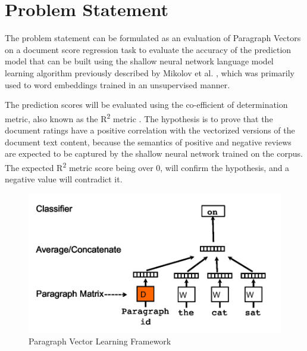 \documentclass[conference]{IEEEtran}
\begin{document}
\vspace{5mm}

\section{Problem Statement} \label{problem_statment}
    The problem statement can be formulated as an evaluation of Paragraph Vectors\cite{le2014distributed} on a document score regression task to evaluate the accuracy of the prediction model that can be built using the shallow neural network language model learning algorithm previously described by Mikolov et al. \cite{mikolov2013efficient}, which was primarily used to word embeddings trained in an unsupervised manner.

    The prediction scores will be evaluated using the co-efficient of determination metric, also known as the R\textsuperscript{2} metric \cite{cameron1997r}. 
    The hypothesis is to prove that the document ratings have a positive correlation with the vectorized versions of the document text content, because the semantics of positive and negative reviews are expected to be captured by the shallow neural network trained on the corpus.
    The expected R\textsuperscript{2} metric score being over 0, will confirm the hypothesis, and a negative value will contradict it.

\begin{figure}[ht]
    \centering
    \includegraphics[width=400pt]{images/docvec_1.png}
    \caption{Paragraph Vector Learning Framework\cite{mikolov2013distributed}}
    \label{fig:paragraph-vector-framework}
\end{figure}

\vspace{5mm}
\end{document}
